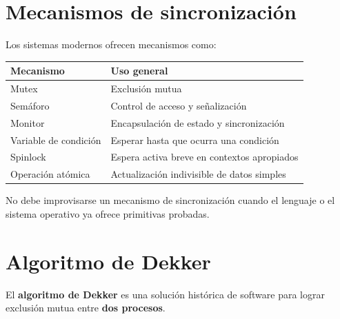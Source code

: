 \documentclass[
  spanish,
  letterpaper,
]{scrbook}
\newcounter{none} %
\begin{document}

\chapter{Mecanismos de
sincronización}\label{mecanismos-de-sincronizaciuxf3n}

Los sistemas modernos ofrecen mecanismos como:

{\def\LTcaptype{none} %
\begin{longtable}[]{@{}ll@{}}
\toprule\noalign{}
Mecanismo & Uso general \\
\midrule\noalign{}
\endhead
\bottomrule\noalign{}
\endlastfoot
Mutex & Exclusión mutua \\
Semáforo & Control de acceso y señalización \\
Monitor & Encapsulación de estado y sincronización \\
Variable de condición & Esperar hasta que ocurra una condición \\
Spinlock & Espera activa breve en contextos apropiados \\
Operación atómica & Actualización indivisible de datos simples \\
\end{longtable}
}

\begin{tcolorbox}[enhanced jigsaw, arc=.35mm, bottomrule=.15mm, bottomtitle=1mm, breakable, colback=white, colbacktitle=quarto-callout-important-color!10!white, colframe=quarto-callout-important-color-frame, coltitle=black, left=2mm, leftrule=.75mm, opacityback=0, opacitybacktitle=0.6, rightrule=.15mm, title=\textcolor{quarto-callout-important-color}{\faExclamation}\hspace{0.5em}{Criterio profesional}, titlerule=0mm, toprule=.15mm, toptitle=1mm]

No debe improvisarse un mecanismo de sincronización cuando el lenguaje o
el sistema operativo ya ofrece primitivas probadas.

\end{tcolorbox}


\chapter{Algoritmo de Dekker}\label{algoritmo-de-dekker}

El \textbf{algoritmo de Dekker} es una solución histórica de software
para lograr exclusión mutua entre \textbf{dos procesos}.
\end{document}
